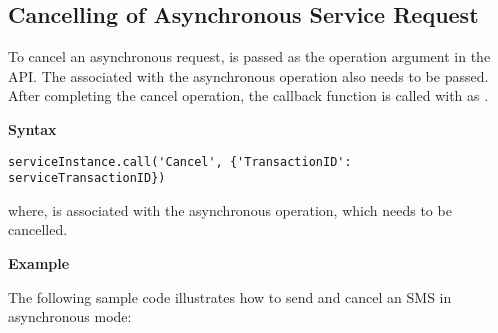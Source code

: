 \subsection{Cancelling of Asynchronous Service Request}
\label{subsec:pycancelasyncservice}

To cancel an asynchronous request,  is passed as the operation argument in the  API. The  associated with the asynchronous operation also needs to be passed. After completing the cancel operation, the callback function is called with  as .

{\bf Syntax} \break

\begin{verbatim}
serviceInstance.call('Cancel', {'TransactionID': serviceTransactionID})
\end{verbatim}

where,  is associated with the asynchronous operation, which needs to be cancelled.

{\bf Example} \break

The following sample code illustrates how to send and cancel an SMS in asynchronous mode:


